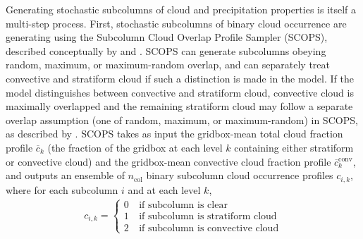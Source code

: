 Generating stochastic subcolumns of cloud and precipitation properties
is itself a multi-step process. First, stochastic subcolumns of binary
cloud occurrence are generating using the Subcolumn Cloud Overlap
Profile Sampler (SCOPS), described conceptually by
\citet{klein_and_jakob_1999} and \citet{webb_et_al_2001}. SCOPS can
generate subcolumns obeying random, maximum, or maximum-random overlap,
and can separately treat convective and stratiform cloud if such a
distinction is made in the model. If the model distinguishes between
convective and stratiform cloud, convective cloud is maximally
overlapped and the remaining stratiform cloud may follow a separate
overlap assumption (one of random, maximum, or maximum-random) in SCOPS,
as described by \citet{webb_et_al_2001}. SCOPS takes as input the
gridbox-mean total cloud fraction profile \(\overline{c}_k\) (the
fraction of the gridbox at each level \(k\) containing either stratiform
or convective cloud) and the gridbox-mean convective cloud fraction
profile \(\overline{c}^\textrm{conv}_k\), and outputs an ensemble of
\(n_\textrm{col}\) binary subcolumn cloud occurrence profiles
\(c_{i, k}\), where for each subcolumn \(i\) and at each level \(k\),
\[\begin{gathered} c_{i, k} = \begin{cases} 0 &
~\text{if subcolumn is clear} \\ 1 & ~\text{if subcolumn is stratiform cloud} \\
2 & ~\text{if subcolumn is convective cloud} \end{cases}\end{gathered}\]

